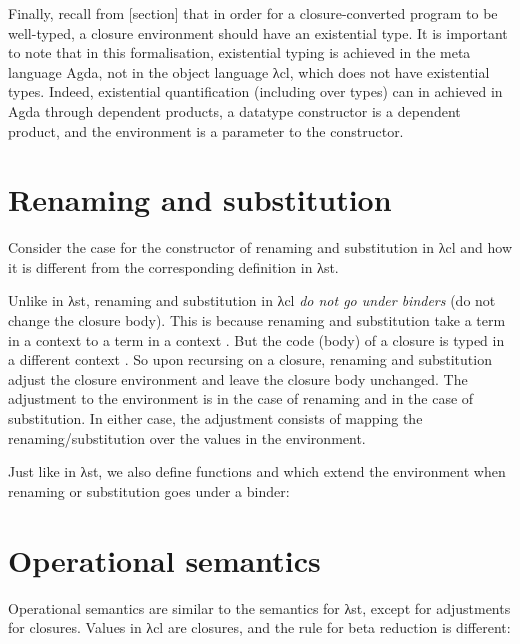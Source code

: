\documentclass[bsc,frontabs,oneside,singlespacing,parskip,deptreport]{infthesis}
\theoremstyle{definition}
\theoremstyle{lemma}
\begin{document}
Finally, recall from [section] that in order for a closure-converted
program to be well-typed, a closure environment should have an
existential type. It is important to note that in this formalisation,
existential typing is achieved in the meta language Agda, not in the
object language λcl, which does not have existential types. Indeed,
existential quantification (including over types) can in achieved in
Agda through dependent products, a datatype constructor is a dependent
product, and the environment is a parameter to the  constructor.

\section{Renaming and substitution}
\label{sec:renam-subst}

Consider the case for the constructor  of renaming and
substitution in λcl and how it is different from the corresponding
definition in λst.


Unlike in λst, renaming and substitution in λcl \textit{do not go
  under binders} (do not change the closure body). This is because
renaming and substitution take a term in a context  to a term in
a context . But the code (body) of a closure is typed in a
different context . So upon recursing on a closure, renaming and
substitution adjust the closure environment and leave the closure body
unchanged. The adjustment to the environment is 
in the case of renaming and  in the case of
substitution. In either case, the adjustment consists of mapping the
renaming/substitution over the values in the environment.

Just like in λst, we also define functions  and 
which extend the environment when renaming or substitution goes under
a binder:


\section{Operational semantics}
\label{sec:oper-semant}

Operational semantics are similar to the semantics for λst, except for
adjustments for closures. Values in λcl are closures, and the rule for
beta reduction is different:
\end{document}

